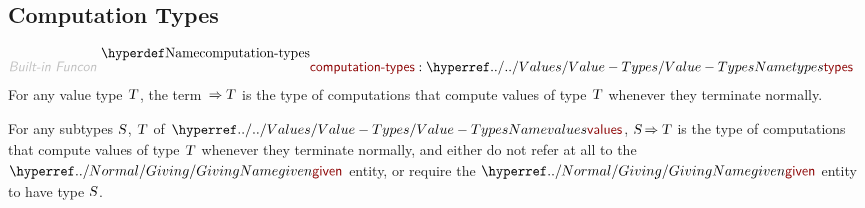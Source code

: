 \subsection*{Computation Types}\hypertarget{computation-types}{}\label{computation-types}

\begin{align*}
  \KEY{Built-in Funcon} ~ 
  & \NAMEDECL{computation-types} : \NAMEHYPER{../../Values}{Value-Types}{types}
\end{align*}
For any value type $\SHADE{\VAR{T}}$, the term $\SHADE{ \TO \VAR{T}}$ is the type of computations that
  compute values of type $\SHADE{\VAR{T}}$ whenever they terminate normally.

For any subtypes $\SHADE{\VAR{S}}$, $\SHADE{\VAR{T}}$ of $\SHADE{\NAMEHYPER{../../Values}{Value-Types}{values}}$, $\SHADE{\VAR{S} \TO \VAR{T}}$ is the type of computations
  that compute values of type $\SHADE{\VAR{T}}$ whenever they terminate normally, and
  either do not refer at all to the $\SHADE{\NAMEHYPER{../Normal}{Giving}{given}}$ entity, or require the $\SHADE{\NAMEHYPER{../Normal}{Giving}{given}}$
  entity to have type $\SHADE{\VAR{S}}$.

